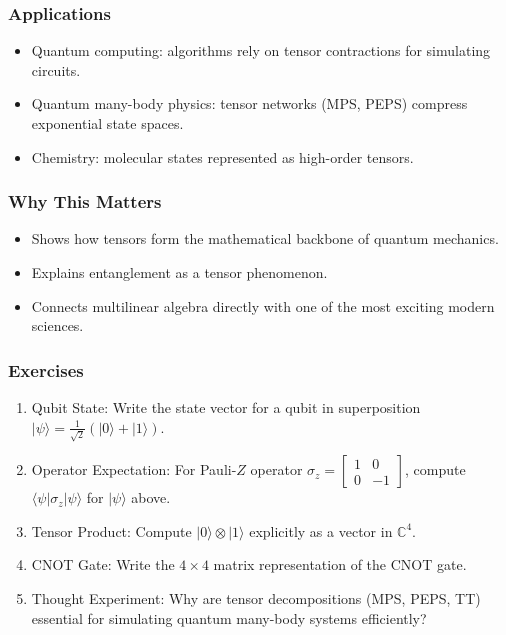 \documentclass[
  letterpaper,
  DIV=11,
  numbers=noendperiod]{scrreprt}
\providecommand{\tightlist}{%
  \setlength{\itemsep}{0pt}\setlength{\parskip}{0pt}}
\begin{document}
\subsubsection{Applications}\label{applications-10}

\begin{itemize}
\tightlist
\item
  Quantum computing: algorithms rely on tensor contractions for
  simulating circuits.
\item
  Quantum many-body physics: tensor networks (MPS, PEPS) compress
  exponential state spaces.
\item
  Chemistry: molecular states represented as high-order tensors.
\end{itemize}

\subsubsection{Why This Matters}\label{why-this-matters-54}

\begin{itemize}
\tightlist
\item
  Shows how tensors form the mathematical backbone of quantum mechanics.
\item
  Explains entanglement as a tensor phenomenon.
\item
  Connects multilinear algebra directly with one of the most exciting
  modern sciences.
\end{itemize}

\subsubsection{Exercises}\label{exercises-68}

\begin{enumerate}
\def\labelenumi{\arabic{enumi}.}
\item
  Qubit State: Write the state vector for a qubit in superposition
  \(|\psi\rangle = \tfrac{1}{\sqrt{2}}(|0\rangle + |1\rangle)\).
\item
  Operator Expectation: For Pauli-\(Z\) operator
  \(\sigma_z = \begin{bmatrix}1 & 0 \\ 0 & -1\end{bmatrix}\), compute
  \(\langle \psi | \sigma_z | \psi \rangle\) for \(|\psi\rangle\) above.
\item
  Tensor Product: Compute \(|0\rangle \otimes |1\rangle\) explicitly as
  a vector in \(\mathbb{C}^4\).
\item
  CNOT Gate: Write the \(4 \times 4\) matrix representation of the CNOT
  gate.
\item
  Thought Experiment: Why are tensor decompositions (MPS, PEPS, TT)
  essential for simulating quantum many-body systems efficiently?
\end{enumerate}
\end{document}

